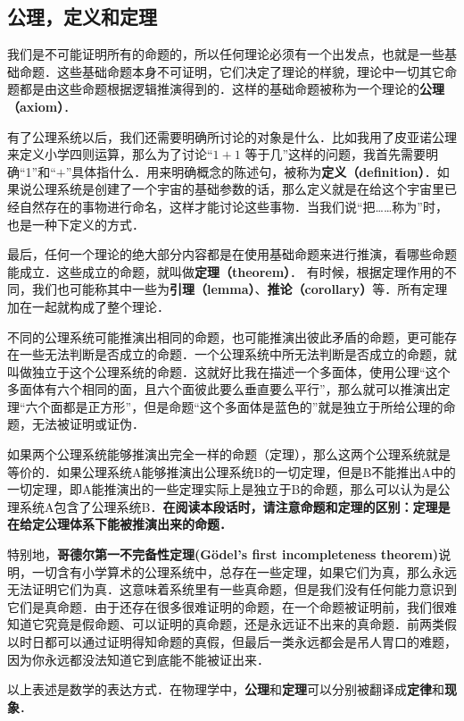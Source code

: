 \subsection{公理，定义和定理}
我们是不可能证明所有的命题的，所以任何理论必须有一个出发点，也就是一些基础命题．这些基础命题本身不可证明，它们决定了理论的样貌，理论中一切其它命题都是由这些命题根据逻辑推演得到的．这样的基础命题被称为一个理论的\textbf{公理（axiom）}．

有了公理系统以后，我们还需要明确所讨论的对象是什么．比如我用了皮亚诺公理来定义小学四则运算，那么为了讨论“$1+1$ 等于几”这样的问题，我首先需要明确“1”和“$+$”具体指什么．用来明确概念的陈述句，被称为\textbf{定义（definition）}．如果说公理系统是创建了一个宇宙的基础参数的话，那么定义就是在给这个宇宙里已经自然存在的事物进行命名，这样才能讨论这些事物．当我们说“把……称为”时，也是一种下定义的方式．

最后，任何一个理论的绝大部分内容都是在使用基础命题来进行推演，看哪些命题能成立．这些成立的命题，就叫做\textbf{定理（theorem）}． 有时候，根据定理作用的不同，我们也可能称其中一些为\textbf{引理（lemma）}、\textbf{推论（corollary）}等．所有定理加在一起就构成了整个理论．

不同的公理系统可能推演出相同的命题，也可能推演出彼此矛盾的命题，更可能存在一些无法判断是否成立的命题．一个公理系统中所无法判断是否成立的命题，就叫做独立于这个公理系统的命题．这就好比我在描述一个多面体，使用公理“这个多面体有六个相同的面，且六个面彼此要么垂直要么平行”，那么就可以推演出定理“六个面都是正方形”，但是命题“这个多面体是蓝色的”就是独立于所给公理的命题，无法被证明或证伪．


如果两个公理系统能够推演出完全一样的命题（定理），那么这两个公理系统就是等价的．如果公理系统A能够推演出公理系统B的一切定理，但是B不能推出A中的一切定理，即A能推演出的一些定理实际上是独立于B的命题，那么可以认为是公理系统A包含了公理系统B．\textbf{在阅读本段话时，请注意命题和定理的区别：定理是在给定公理体系下能被推演出来的命题．}

特别地，\textbf{哥德尔第一不完备性定理(Gödel's first incompleteness theorem)}说明，一切含有小学算术的公理系统中，总存在一些定理，如果它们为真，那么永远无法证明它们为真．这意味着系统里有一些真命题，但是我们没有任何能力意识到它们是真命题．由于还存在很多很难证明的命题，在一个命题被证明前，我们很难知道它究竟是假命题、可以证明的真命题，还是永远证不出来的真命题．前两类假以时日都可以通过证明得知命题的真假，但最后一类永远都会是吊人胃口的难题，因为你永远都没法知道它到底能不能被证出来．

以上表述是数学的表达方式．在物理学中，\textbf{公理}和\textbf{定理}可以分别被翻译成\textbf{定律}和\textbf{现象}． 


